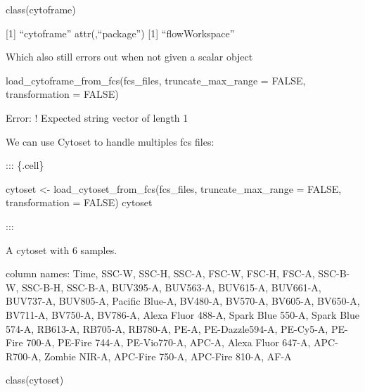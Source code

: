 \documentclass[
  letterpaper,
  DIV=11,
  numbers=noendperiod]{scrartcl}
\newenvironment{Shaded}{\begin{snugshade}}{\end{snugshade}}
\newcommand{\AttributeTok}[1]{\textcolor[rgb]{0.40,0.45,0.13}{#1}}
\newcommand{\ConstantTok}[1]{\textcolor[rgb]{0.56,0.35,0.01}{#1}}
\newcommand{\FunctionTok}[1]{\textcolor[rgb]{0.28,0.35,0.67}{#1}}
\newcommand{\NormalTok}[1]{\textcolor[rgb]{0.00,0.23,0.31}{#1}}
\newcommand{\OtherTok}[1]{\textcolor[rgb]{0.00,0.23,0.31}{#1}}
\begin{document}
\begin{Shaded}
\begin{Highlighting}[]
\FunctionTok{class}\NormalTok{(cytoframe)}
\end{Highlighting}
\end{Shaded}

{[}1{]} ``cytoframe'' attr(,``package'') {[}1{]} ``flowWorkspace''

Which also still errors out when not given a scalar object

\begin{Shaded}
\begin{Highlighting}[]
\FunctionTok{load\_cytoframe\_from\_fcs}\NormalTok{(fcs\_files, }\AttributeTok{truncate\_max\_range =} \ConstantTok{FALSE}\NormalTok{, }\AttributeTok{transformation =} \ConstantTok{FALSE}\NormalTok{)}
\end{Highlighting}
\end{Shaded}

Error: ! Expected string vector of length 1

We can use Cytoset to handle multiples fcs files:

::: \{.cell\}

\begin{Shaded}
\begin{Highlighting}[]
\NormalTok{cytoset }\OtherTok{\textless{}{-}} \FunctionTok{load\_cytoset\_from\_fcs}\NormalTok{(fcs\_files, }\AttributeTok{truncate\_max\_range =} \ConstantTok{FALSE}\NormalTok{, }\AttributeTok{transformation =} \ConstantTok{FALSE}\NormalTok{)}
\NormalTok{cytoset}
\end{Highlighting}
\end{Shaded}

:::

A cytoset with 6 samples.

column names: Time, SSC-W, SSC-H, SSC-A, FSC-W, FSC-H, FSC-A, SSC-B-W,
SSC-B-H, SSC-B-A, BUV395-A, BUV563-A, BUV615-A, BUV661-A, BUV737-A,
BUV805-A, Pacific Blue-A, BV480-A, BV570-A, BV605-A, BV650-A, BV711-A,
BV750-A, BV786-A, Alexa Fluor 488-A, Spark Blue 550-A, Spark Blue 574-A,
RB613-A, RB705-A, RB780-A, PE-A, PE-Dazzle594-A, PE-Cy5-A, PE-Fire
700-A, PE-Fire 744-A, PE-Vio770-A, APC-A, Alexa Fluor 647-A, APC-R700-A,
Zombie NIR-A, APC-Fire 750-A, APC-Fire 810-A, AF-A

\begin{Shaded}
\begin{Highlighting}[]
\FunctionTok{class}\NormalTok{(cytoset)}
\end{Highlighting}
\end{Shaded}
\end{document}

